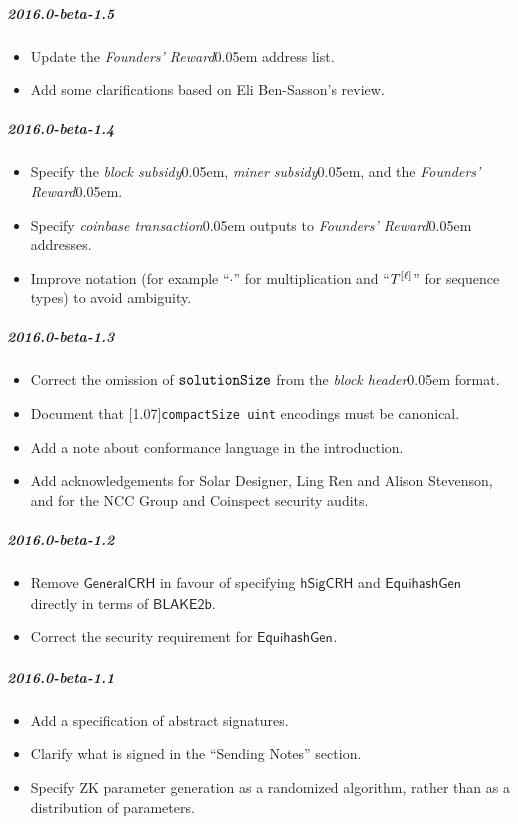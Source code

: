 \documentclass{article}
\let\oldtexttt\texttt
\let\oldmathtt\mathtt
\renewcommand{\texttt}[1]{\scalebox{1.02}[1.07]{\oldtexttt{#1}}}
\renewcommand{\mathtt}[1]{\scalebox{1.02}[1.07]{$\oldmathtt{#1}$}}
\newcommand{\introlist}{\needspace{15ex}}
\newcommand{\term}[1]{\textsl{#1}\kern 0.05em\xspace}
\newcommand{\blockHeader}{\term{block header}}
\newcommand{\coinbaseTransaction}{\term{coinbase transaction}}
\newcommand{\typeexp}[2]{{#1}\vphantom{)}^{[{#2}]}}
\newcommand{\hSigCRH}{\mathsf{hSigCRH}}
\newcommand{\EquihashGen}[1]{\mathsf{EquihashGen}_{#1}}
\newcommand{\BlakeGeneric}{\mathsf{BLAKE2b}}
\newcommand{\mult}{\cdot}
\newcommand{\blockSubsidy}{\term{block subsidy}}
\newcommand{\minerSubsidy}{\term{miner subsidy}}
\newcommand{\foundersReward}{\term{Founders' Reward}}
\newcommand{\type}[1]{\texttt{#1}}
\newcommand{\compactSize}{\type{compactSize uint}}
\newcommand{\solutionSize}{\mathtt{solutionSize}}
\begin{document}
\introlist
\subparagraph{2016.0-beta-1.5}

\begin{itemize}
    \item Update the \foundersReward address list.
    \item Add some clarifications based on Eli Ben-Sasson's review.
\end{itemize}

\introlist
\subparagraph{2016.0-beta-1.4}

\begin{itemize}
    \item Specify the \blockSubsidy, \minerSubsidy, and the \foundersReward.
    \item Specify \coinbaseTransaction outputs to \foundersReward addresses.
    \item Improve notation (for example ``$\mult$'' for multiplication and
          ``$\typeexp{T}{\ell}$'' for sequence types) to avoid ambiguity.
\end{itemize}

\introlist
\subparagraph{2016.0-beta-1.3}

\begin{itemize}
    \item Correct the omission of $\solutionSize$ from the \blockHeader format.
    \item Document that \compactSize{} encodings must be canonical.
    \item Add a note about conformance language in the introduction.
    \item Add acknowledgements for Solar Designer, Ling Ren and Alison Stevenson,
          and for the NCC Group and Coinspect security audits.
\end{itemize}

\introlist
\subparagraph{2016.0-beta-1.2}

\begin{itemize}
    \item Remove $\mathsf{GeneralCRH}$ in favour of specifying $\hSigCRH$ and
          $\EquihashGen{}$ directly in terms of $\BlakeGeneric$.
    \item Correct the security requirement for $\EquihashGen{}$.
\end{itemize}

\introlist
\subparagraph{2016.0-beta-1.1}

\begin{itemize}
    \item Add a specification of abstract signatures.
    \item Clarify what is signed in the ``Sending Notes'' section.
    \item Specify ZK parameter generation as a randomized algorithm, rather
          than as a distribution of parameters.
\end{itemize}
\end{document}
